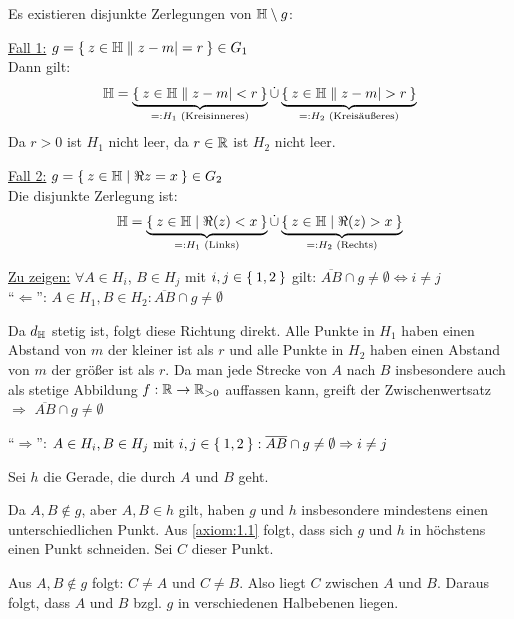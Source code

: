 \begin{beweis}
\begin{enumerate}[label=\alph*), ref=\theproposition (\alph*)]
              Es existieren disjunkte Zerlegungen von $\mathbb{H} \setminus g$:

              \underline{Fall 1:} $g = \Set{z \in \ensuremath{\mathbb{H}}| |z-m| = r} \in G_1$\\
              Dann gilt:
              \[\mathbb{H} = \underbrace{\Set{z \in \ensuremath{\mathbb{H}}| |z-m| < r}}_{=:H_1 \text{ (Kreisinneres)}} \mathbin{\dot{\cup}} \underbrace{\Set{z \in \ensuremath{\mathbb{H}}| |z-m| > r}}_{=:H_2 \text{ (Kreisäußeres)}}\]
              Da $r > 0$ ist $H_1$ nicht leer, da $r \in \mathbb{R}$ ist $H_2$ nicht leer.

              \underline{Fall 2:} $g = \Set{z \in \ensuremath{\mathbb{H}}| \Re{z} = x} \in G_2$\\
              Die disjunkte Zerlegung ist:
              \[\mathbb{H} = \underbrace{\Set{z \in \ensuremath{\mathbb{H}}| \Re(z) < x}}_{=: H_1 \text{ (Links)}} \mathbin{\dot{\cup}} \underbrace{\Set{z \in \ensuremath{\mathbb{H}}| \Re(z) > x}}_{=: H_2 \text{ (Rechts)}}\]

              \underline{Zu zeigen:}
              $\forall A \in H_i$, $B \in H_j$ mit
                      $i,j \in \Set{1,2}$ gilt:
                      $\overline{AB} \cap g \neq \emptyset \Leftrightarrow i \neq j$\\
              \enquote{$\Leftarrow$}: $A \in H_1, B \in H_2: \overline{AB} \cap g \neq \emptyset$

              Da $d_{\mathbb{H}}$ stetig ist, folgt diese Richtung
              direkt. Alle Punkte in $H_1$ haben einen Abstand von $m$ der kleiner
              ist als $r$ und alle Punkte in $H_2$ haben einen Abstand von $m$ der
              größer ist als $r$. Da man jede Strecke von $A$ nach $B$ insbesondere
              auch als stetige Abbildung $f: \mathbb{R} \rightarrow \mathbb{R}_{>0}$ auffassen
              kann, greift der Zwischenwertsatz $\Rightarrow$ $\overline{AB} \cap g \neq \emptyset$

              \enquote{$\Rightarrow$}: $A \in H_i, B \in H_j \text{ mit } i,j \in \Set{1,2}: \overline{AB} \cap g \neq \emptyset \Rightarrow i \neq j$

              Sei $h$ die Gerade, die durch $A$ und $B$ geht.

              Da $A,B \notin g$, aber $A, B \in h$ gilt, haben $g$ und $h$
              insbesondere
              mindestens einen unterschiedlichen Punkt. Aus \ref{axiom:1.1} folgt, dass sich
              $g$ und $h$ in höchstens einen Punkt schneiden. Sei $C$ dieser
              Punkt.

              Aus $A,B \notin g$ folgt: $C \neq A$ und $C \neq B$. Also liegt
              $C$ zwischen $A$ und $B$. Daraus folgt, dass $A$ und $B$ bzgl.
              $g$ in verschiedenen Halbebenen liegen.


\end{enumerate}
\end{beweis}
